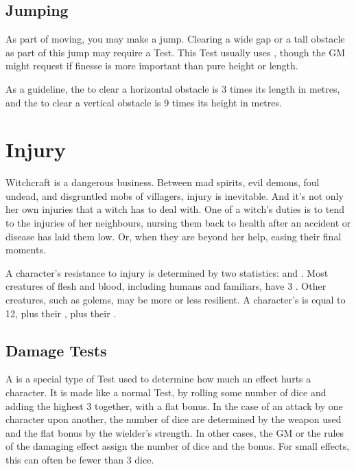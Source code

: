 \subsection{Jumping}

As part of moving, you may make a jump.
Clearing a wide gap or a tall obstacle as part of this jump may require a Test.
This Test usually uses , though the GM might request  if finesse is more important than pure height or length.

As a guideline, the {\tn} to clear a horizontal obstacle is 3 times its length in metres, and the {\tn} to clear a vertical obstacle is 9 times its height in metres.

\section{Injury}

Witchcraft is a dangerous business.
Between mad spirits, evil demons, foul undead, and disgruntled mobs of villagers, injury is inevitable.
And it's not only her own injuries that a witch has to deal with.
One of a witch's duties is to tend to the injuries of her neighbours, nursing them back to health after an accident or disease has laid them low.
Or, when they are beyond her help, easing their final moments.

A character's resistance to injury is determined by two statistics:  and .
Most creatures of flesh and blood, including humans and familiars, have $3$ .
Other creatures, such as golems, may be more or less resilient.
A character's  is equal to 12, plus their , plus their .

\subsection{Damage Tests}

A {\damagetest} is a special type of Test used to determine how much an effect hurts a character.
It is made like a normal Test, by rolling some number of dice and adding the highest 3 together, with a flat bonus.
In the case of an attack by one character upon another, the number of dice are determined by the weapon used and the flat bonus by the wielder's strength.
In other cases, the GM or the rules of the damaging effect assign the number of dice and the bonus.
For small effects, this can often be fewer than 3 dice.

